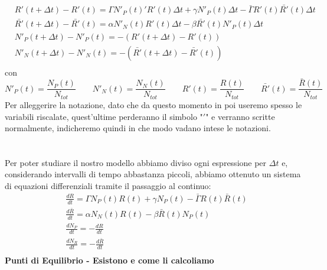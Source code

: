 \begin{equation} \label{eq: 1.3}
	\begin{aligned}
		&R'(t+\Delta t)-R'(t)=\Gamma N'_P(t)'R'(t)\Delta t+\gamma N'_P(t)\Delta t-\bar{\Gamma}R'(t)\bar{R'}(t)\Delta t\\
	&\bar{R'}(t+\Delta t)-\bar{R'}(t)=\alpha N'_N(t)R'(t)\Delta t-\beta \bar{R'}(t)N'_P(t)\Delta t\\
	&N'_P(t+\Delta t)-N'_P(t)=-(R'(t+\Delta t)-R'(t))\\
	&N'_N(t+\Delta t)-N'_N(t)=-(\bar{R'}(t+\Delta t)-\bar{R'}(t))\\
	\end{aligned}
\end{equation}	
con 
\begin{equation*}
	N'_{P}(t)=\frac{N_{P}(t)}{N_{tot}} \qquad 	N'_{N}(t)=\frac{N_{N}(t)}{N_{tot}} \qquad	R'(t)=\frac{R(t)}{N_{tot}} \qquad	\bar{R'}(t)=\frac{\bar{R}(t)}{N_{tot}} 
\end{equation*}
Per alleggerire la notazione, dato che da questo momento in poi useremo spesso le variabili riscalate, quest'ultime perderanno il simbolo "$ ' $" e verranno scritte normalmente, indicheremo quindi in che modo vadano intese le notazioni. \\
%
\\\\ 
Per poter studiare il nostro modello abbiamo diviso ogni espressione per $ \Delta t $ e, considerando intervalli di tempo abbastanza piccoli, abbiamo ottenuto un sistema di equazioni differenziali tramite il passaggio al continuo:
\begin{equation} \label{eq:1.4}
		\begin{aligned}
			&\frac{dR}{dt}=\Gamma N_P(t) R(t)+\gamma N_P(t)-\bar{\Gamma}R(t)\bar{R}(t)\\
		&\frac{d\bar{R}}{dt}=\alpha N_N(t)R(t)-\beta \bar{R}(t)N_P(t)\\
		&\frac{dN_{P}}{dt}= -\frac{dR}{dt}\\
		&\frac{dN_{R}}{dt}= -\frac{d\bar{R}}{dt}\\
		\end{aligned}
\end{equation}
\textbf{Punti di Equilibrio - Esistono e come li calcoliamo}

